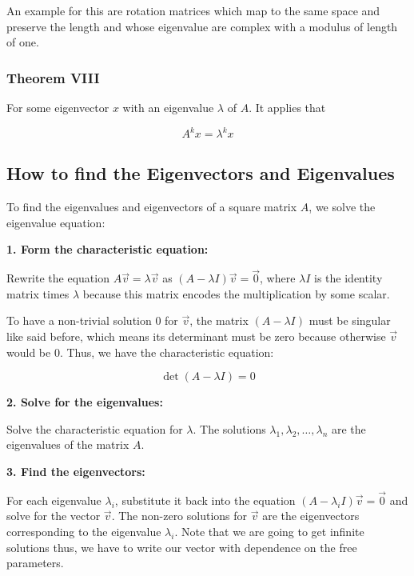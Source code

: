 An example for this are rotation matrices which map to the same space and preserve the length and 
whose eigenvalue are complex with a modulus of length of one.

\subsubsection{Theorem VIII}

For some eigenvector \(x\) with an eigenvalue \(\lambda\) of \(A\). It applies that

\[
    A^{k}x = \lambda^{k}x
\]


\subsection{How to find the Eigenvectors and Eigenvalues}

To find the eigenvalues and eigenvectors of a square matrix \(A\), we solve the eigenvalue equation:
\vspace{\baselineskip}

\textbf{1. Form the characteristic equation:}

Rewrite the equation \(A\vec{v} = \lambda\vec{v}\) as 
\((A - \lambda I)\vec{v} = \vec{0}\), where \(\lambda I\) is the identity matrix times \(\lambda\) because 
this matrix encodes the multiplication by some scalar. 
    
To have a non-trivial solution \(0\) for \(\vec{v}\), the matrix \((A - \lambda I)\) must be 
singular like said before, which means its determinant must be zero because otherwise \(\vec{v}\) 
would be 0. Thus, we have the characteristic equation:

\[
    \det(A - \lambda I) = 0
\]

\textbf{2. Solve for the eigenvalues:}

Solve the characteristic equation for \(\lambda\). The solutions 
\(\lambda_1, \lambda_2, \dots, \lambda_n\) are the eigenvalues of the matrix \(A\).
\vspace{\baselineskip}

\textbf{3. Find the eigenvectors:}

For each eigenvalue \(\lambda_i\), substitute it back into the equation 
\((A - \lambda_i I)\vec{v} = \vec{0}\) and solve for the vector \(\vec{v}\). The non-zero 
solutions for \(\vec{v}\) are the eigenvectors corresponding to the eigenvalue 
\(\lambda_i\). Note that we are going to get infinite solutions thus, we have to write 
our vector with dependence on the free 
parameters.
\vspace{\baselineskip}

